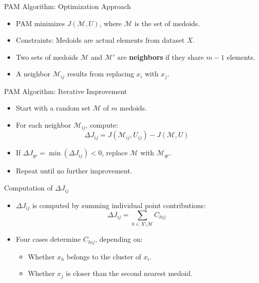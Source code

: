 \documentclass{beamer}
\begin{document}
\begin{frame}{PAM Algorithm: Optimization Approach}
    \begin{itemize}
        \item PAM minimizes \(J(\mathcal{M}, U)\), where \(\mathcal{M}\) is the set of medoids.
        \item Constraints: Medoids are actual elements from dataset \(X\).
        \item Two sets of medoids \(\mathcal{M}\) and \(\mathcal{M'}\) are \textbf{neighbors} if they share \(m-1\) elements.
        \item A neighbor \(\mathcal{M}_{ij}\) results from replacing \(x_i\) with \(x_j\).
    \end{itemize}
\end{frame}

\begin{frame}{PAM Algorithm: Iterative Improvement}
    \begin{itemize}
        \item Start with a random set \(\mathcal{M}\) of \(m\) medoids.
        \item For each neighbor \(\mathcal{M}_{ij}\), compute:
            \[
            \Delta J_{ij} = J(\mathcal{M}_{ij}, U_{ij}) - J(\mathcal{M}, U)
            \]
        \item If \(\Delta J_{qr} = \min(\Delta J_{ij}) < 0\), replace \(\mathcal{M}\) with \(\mathcal{M}_{qr}\).
        \item Repeat until no further improvement.
    \end{itemize}
\end{frame}

\begin{frame}{Computation of \(\Delta J_{ij}\)}
    \begin{itemize}
        \item \(\Delta J_{ij}\) is computed by summing individual point contributions:
        \[
        \Delta J_{ij} = \sum_{h \in X \setminus \mathcal{M}} C_{hij}
        \]
        \item Four cases determine \(C_{hij}\), depending on:
        \begin{itemize}
            \item Whether \(x_h\) belongs to the cluster of \(x_i\).
            \item Whether \(x_j\) is closer than the second nearest medoid.
        \end{itemize}
    \end{itemize}
\end{frame}
\end{document}

